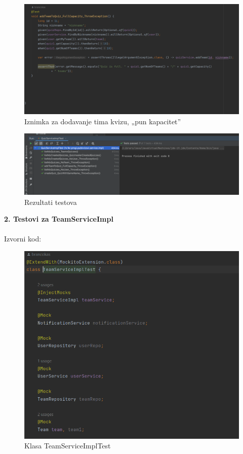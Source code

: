 				\begin{figure}[H]
					\includegraphics[width=\textwidth]{slike/QuizServiceImplTest5.PNG} 
					\caption{Iznimka za dodavanje tima kvizu, „pun kapacitet”}
					\label{fig:QuizServiceImplTest5}
				\end{figure}
			
				\begin{figure}[H]
					\includegraphics[width=\textwidth]{slike/QuizServiceImplTestRez.PNG} 
					\caption{Rezultati testova}
					\label{fig:QuizServiceImplTestRez}
				\end{figure}
			
			
			
			\textbf{2. Testovi za TeamServiceImpl} \\ \\
			Izvorni kod:
			
				\begin{figure}[H]
					\includegraphics[width=\textwidth]{slike/TeamServiceImplTest1.PNG} 
					\caption{Klasa TeamServiceImplTest}
					\label{fig:TeamServiceImplTest1}
				\end{figure}
			
